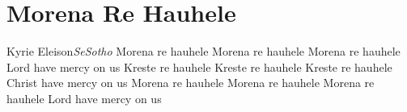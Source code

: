 \starttocol
\chapter{Morena Re Hauhele}
\nexttocol
K{\sc yrie Eleison}\hfill {\it SeSotho}
\stoptocol
\starttocol
\startlines
M{\sc orena} re hauhele
Morena re hauhele
Morena re hauhele
\stoplines
\nexttocol
%
Lord have mercy on us
\stoptocol
\starttocol
\startlines
Kreste re hauhele
Kreste re hauhele
Kreste re hauhele
\stoplines
\nexttocol
Christ have mercy on us
\stoptocol
\starttocol
\startlines
Morena re hauhele
Morena re hauhele
Morena re hauhele
\stoplines
\nexttocol
Lord have mercy on us
\stoptocol
